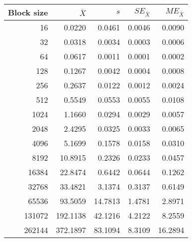 \begin{tabular}{rrrrr}\toprule
{\small Block size} & $\bar{X}$ & $s$ & $SE_{\bar{X}}$ & $ME_{\bar{X}}$ \\\midrule
16 & 0.0220 & 0.0461 & 0.0046 & 0.0090\\
32 & 0.0318 & 0.0034 & 0.0003 & 0.0006\\
64 & 0.0617 & 0.0011 & 0.0001 & 0.0002\\
128 & 0.1267 & 0.0042 & 0.0004 & 0.0008\\
256 & 0.2637 & 0.0122 & 0.0012 & 0.0024\\
512 & 0.5549 & 0.0553 & 0.0055 & 0.0108\\
1024 & 1.1660 & 0.0294 & 0.0029 & 0.0057\\
2048 & 2.4295 & 0.0325 & 0.0033 & 0.0065\\
4096 & 5.1699 & 0.1578 & 0.0158 & 0.0310\\
8192 & 10.8915 & 0.2326 & 0.0233 & 0.0457\\
16384 & 22.8474 & 0.6442 & 0.0644 & 0.1262\\
32768 & 33.4821 & 3.1374 & 0.3137 & 0.6149\\
65536 & 93.5059 & 14.7813 & 1.4781 & 2.8971\\
131072 & 192.1138 & 42.1216 & 4.2122 & 8.2559\\
262144 & 372.1897 & 83.1094 & 8.3109 & 16.2894\\
\bottomrule
\end{tabular}

